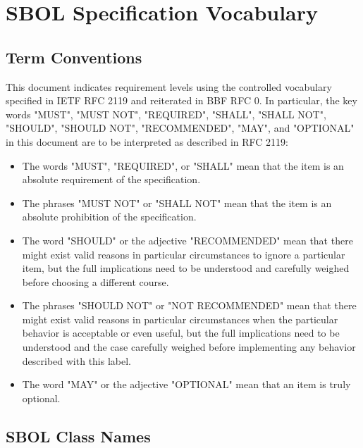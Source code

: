 \section{SBOL Specification Vocabulary}

\subsection{Term Conventions}

This document indicates requirement levels using the controlled vocabulary specified in IETF RFC 2119 and reiterated in BBF RFC 0.
In particular, the key words "MUST", "MUST NOT", "REQUIRED", "SHALL", "SHALL NOT", "SHOULD", "SHOULD NOT", "RECOMMENDED", "MAY", and "OPTIONAL" in this document are to be interpreted as described in RFC 2119:

\begin{itemize}
\item The words "MUST", "REQUIRED", or "SHALL" mean that the item is an absolute requirement of the specification.
\item The phrases "MUST NOT" or "SHALL NOT" mean that the item is an absolute prohibition of the specification.
\item The word "SHOULD" or the adjective "RECOMMENDED" mean that there might exist valid reasons in particular circumstances to ignore a particular item, but the full implications need to be understood and carefully weighed before choosing a different course.
\item The phrases "SHOULD NOT" or "NOT RECOMMENDED" mean that there might exist valid reasons in particular circumstances when the particular behavior is acceptable or even useful, but the full implications need to be understood and the case carefully weighed before implementing any behavior described with this label.
\item The word "MAY" or the adjective "OPTIONAL" mean that an item is truly optional.
\end{itemize}

\subsection{SBOL Class Names}


